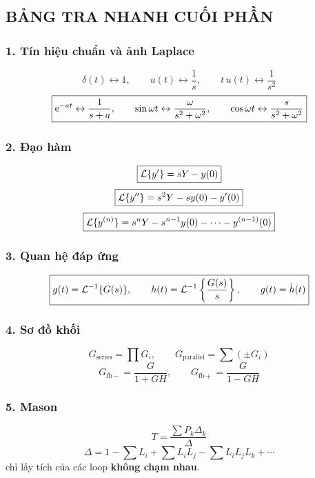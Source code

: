 \subsection*{BẢNG TRA NHANH CUỐI PHẦN}

\subsubsection*{1. Tín hiệu chuẩn và ảnh Laplace}

\[
\boxed{
\delta(t)\leftrightarrow1,\qquad
u(t)\leftrightarrow\frac1s,\qquad
t\,u(t)\leftrightarrow\frac1{s^2}
}
\]
\[
\boxed{
\mathrm{e}^{-at}\leftrightarrow\frac1{s+a},\qquad
\sin\omega t\leftrightarrow\frac{\omega}{s^2+\omega^2},\qquad
\cos\omega t\leftrightarrow\frac{s}{s^2+\omega^2}
}
\]

\subsubsection*{2. Đạo hàm}

\[
\boxed{
\mathcal{L}\{y'\}=sY-y(0)
}
\]
\[
\boxed{
\mathcal{L}\{y''\}=s^2Y-sy(0)-y'(0)
}
\]
\[
\boxed{
\mathcal{L}\{y^{(n)}\}
=s^nY-s^{n-1}y(0)-\cdots-y^{(n-1)}(0)
}
\]

\subsubsection*{3. Quan hệ đáp ứng}

\[
\boxed{
g(t)=\mathcal{L}^{-1}\{G(s)\},\qquad
h(t)=\mathcal{L}^{-1}\left\{\frac{G(s)}{s}\right\},\qquad
g(t)=\dot h(t)
}
\]

\subsubsection*{4. Sơ đồ khối}

\[
\boxed{
G_{\mathrm{series}}=\prod G_i,\qquad
G_{\mathrm{parallel}}=\sum (\pm G_i)
}
\]
\[
\boxed{
G_{\mathrm{fb-}}=\frac{G}{1+GH},\qquad
G_{\mathrm{fb+}}=\frac{G}{1-GH}
}
\]

\subsubsection*{5. Mason}

\[
\boxed{
T=\frac{\sum P_k\Delta_k}{\Delta}
}
\]
\[
\boxed{
\Delta=1-\sum L_i+\sum L_iL_j-\sum L_iL_jL_k+\cdots
}
\]
chỉ lấy tích của các loop \textbf{không chạm nhau}.

